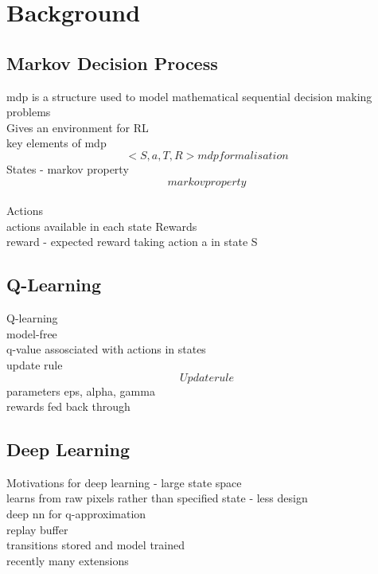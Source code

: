 
\chapter{Background}
\section{Markov Decision Process}
mdp is a structure used to model mathematical sequential decision making problems\\
Gives an environment for RL\\
key elements of mdp\\
\[ < S, a, T, R> mdp formalisation\]
States - markov property\\
\[markov property\]\\
Actions\\
actions available in each state
Rewards\\
reward - expected reward taking action a in state S

\section{Q-Learning}
\cite{watkins1992q} Q-learning \\
model-free\\
q-value assosciated with actions in states\\
update rule
\[Update rule\]
parameters eps, alpha, gamma\\
rewards fed back through
\section{Deep Learning}
Motivations for deep learning - large state space\\
learns from raw pixels rather than specified state - less design\\
deep nn for q-approximation\\
replay buffer\\
transitions stored and model trained\\
recently many extensions \cite{hessel2018rainbow}
